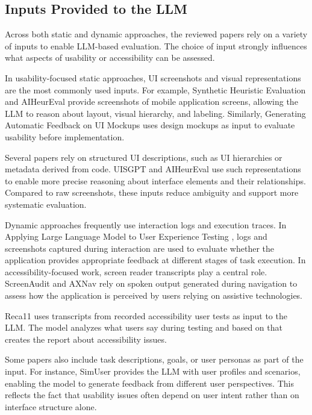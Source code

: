 \documentclass[acmsmall,nonacm]{acmart}
\begin{document}
\subsection{Inputs Provided to the LLM}

Across both static and dynamic approaches, the reviewed papers rely on a variety of inputs to enable LLM-based evaluation. The choice of input strongly influences what aspects of usability or accessibility can be assessed.

In usability-focused static approaches, UI screenshots and visual representations are the most commonly used inputs. For example, Synthetic Heuristic Evaluation \cite{zhong2023synthetic_heuristic} and AIHeurEval \cite{wang2024aiheureval} provide screenshots of mobile application screens, allowing the LLM to reason about layout, visual hierarchy, and labeling. Similarly, Generating Automatic Feedback on UI Mockups \cite{duan2024ui_mockup_feedback} uses design mockups as input to evaluate usability before implementation.

Several papers rely on structured UI descriptions, such as UI hierarchies or metadata derived from code. UISGPT \cite{yang2023uisgpt} and AIHeurEval \cite{wang2024aiheureval} use such representations to enable more precise reasoning about interface elements and their relationships. Compared to raw screenshots, these inputs reduce ambiguity and support more systematic evaluation.

Dynamic approaches frequently use interaction logs and execution traces. In Applying Large Language Model to User Experience Testing \cite{hsueh2023llm_ux_testing}, logs and screenshots captured during interaction are used to evaluate whether the application provides appropriate feedback at different stages of task execution. In accessibility-focused work, screen reader transcripts play a central role. ScreenAudit \cite{zhong2024screenaudit} and AXNav \cite{taeb2023axnav} rely on spoken output generated during navigation to assess how the application is perceived by users relying on assistive technologies.

Reca11 \cite{huq2023reca11} uses transcripts from recorded accessibility user tests as input to the LLM. The model analyzes what users say during testing and based on that creates the report about accessibility issues.

Some papers also include task descriptions, goals, or user personas as part of the input. For instance, SimUser \cite{xiang2023simuser} provides the LLM with user profiles and scenarios, enabling the model to generate feedback from different user perspectives. This reflects the fact that usability issues often depend on user intent rather than on interface structure alone.
\end{document}
